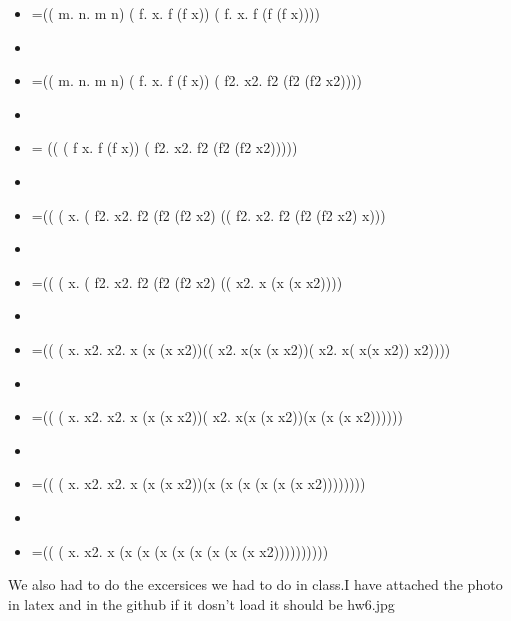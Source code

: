 \documentclass{article}
\theoremstyle{theorem}
\theoremstyle{definition}
\theoremstyle{remark}
\begin{document}
\begin{enumerate}
\begin{enumerate}
\begin{itemize}
\item =(( \lambda m. \lambda n. m n) ( \lambda f. \lambda x. f (f x)) ( \lambda f. \lambda x. f (f (f x))))
\item 
\item =(( \lambda m. \lambda n. m n) ( \lambda f. \lambda x. f (f x)) ( \lambda f2. \lambda x2. f2 (f2 (f2 x2))))
\item 
\item = (( ( \lambda f \lambda x. f (f x)) ( \lambda f2. \lambda x2. f2 (f2 (f2 x2)))))
\item 
\item =(( ( \lambda x. ( \lambda f2. \lambda x2. f2 (f2 (f2 x2) (( \lambda f2. \lambda x2. f2 (f2 (f2 x2) x)))
\item 
\item =(( ( \lambda x. ( \lambda f2. \lambda x2. f2 (f2 (f2 x2) (( \lambda x2. x (x (x x2))))
\item 
\item =(( ( \lambda x. \lambda x2. \lambda x2. x (x (x x2))(( \lambda x2. x(x (x x2))( \lambda x2. x( x(x x2)) x2))))
\item 
\item =(( ( \lambda x. \lambda x2. \lambda x2. x (x (x x2))( \lambda x2. x(x (x x2))(x (x (x x2))))))
\item 
\item =(( ( \lambda x. \lambda x2. \lambda x2. x (x (x x2))(x (x (x (x (x (x x2))))))))
\item 
\item =(( ( \lambda x. \lambda x2. x (x (x (x (x (x (x (x (x x2))))))))))
\end{itemize}
\end{enumerate}
We also had to do the excersices we had to do in class.I have attached the photo in latex and in the github if it dosn't load it should be hw6.jpg


\end{enumerate}
\end{document}
